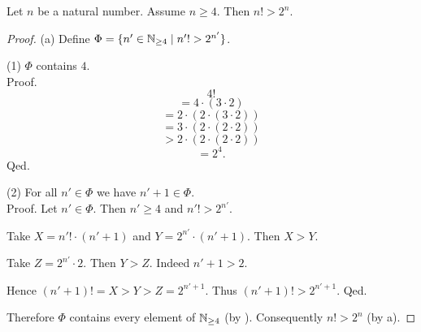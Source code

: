 \documentclass[10pt]{article}
\begin{document}
  \begin{forthel}
    \begin{proposition}
      Let $n$ be a natural number.
      Assume $n \geq 4$.
      Then $n! > 2^{n}$.
    \end{proposition}
    \begin{proof}
      (a) Define $\Phi = \{ n' \in \mathbb{N}_{\geq 4} \mid n'! > 2^{n'} \}$.
  
      (1) $\Phi$ contains $4$. \\
      Proof.
        \[  4!                                  \]
        \[    = 4 \cdot (3 \cdot 2)             \]
        \[    = 2 \cdot (2 \cdot (3 \cdot 2))   \]
        \[    = 3 \cdot (2 \cdot (2 \cdot 2))   \]
        \[    > 2 \cdot (2 \cdot (2 \cdot 2))   \]
        \[    = 2^{4}.                          \]
      Qed.
  
      (2) For all $n' \in \Phi$ we have $n' + 1 \in \Phi$. \\
      Proof.
        Let $n' \in \Phi$.
        Then $n' \geq 4$ and $n'! > 2^{n'}$.

        Take $X = n'! \cdot (n' + 1)$ and $Y = 2^{n'} \cdot (n' + 1)$.
        Then $X > Y$.

        Take $Z = 2^{n'} \cdot 2$.
        Then $Y > Z$.
        Indeed $n' + 1 > 2$.

        Hence $(n' + 1)! = X > Y > Z = 2^{n' + 1}$.
        Thus $(n' + 1)! > 2^{n' + 1}$.
      Qed.
  
      Therefore $\Phi$ contains every element of $\mathbb{N}_{\geq 4}$ (by ).
      Consequently $n! > 2^{n}$ (by a).
    \end{proof}
  \end{forthel}
\end{document}
